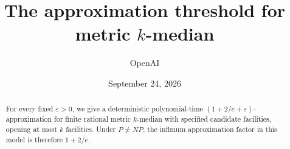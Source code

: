 \documentclass[11pt]{article}
\title{The approximation threshold for metric \(k\)-median}
\author{OpenAI}
\date{September 24, 2026}
\theoremstyle{definition}
\theoremstyle{remark}
\numberwithin{equation}{section}
\begin{document}
\maketitle

\begin{abstract}
For every fixed \(\varepsilon>0\), we give a deterministic polynomial-time
\((1+2/e+\varepsilon)\)-approximation for finite rational metric
\(k\)-median with specified candidate facilities, opening at most \(k\)
facilities. Under \(P\ne NP\), the infimum approximation factor in this
model is therefore \(1+2/e\).
\end{abstract}







\appendix




\end{document}
